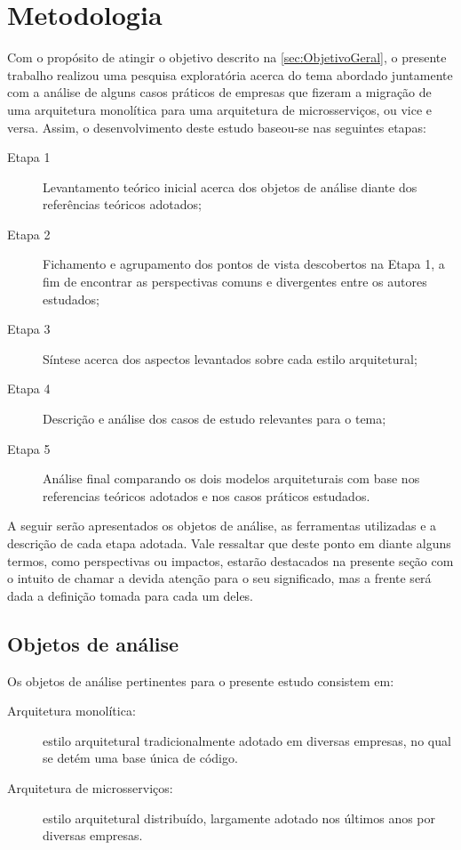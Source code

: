 \chapter{Metodologia}
\label{sec:Metodologia}

Com o propósito de atingir o objetivo descrito na \autoref{sec:ObjetivoGeral}, o presente trabalho
realizou uma pesquisa exploratória acerca do tema abordado juntamente com a análise de alguns casos
práticos de empresas que fizeram a migração de uma arquitetura monolítica para uma arquitetura de
microsserviços, ou vice e versa. Assim, o desenvolvimento deste estudo baseou-se nas seguintes etapas:

\begin{description}
    \item [Etapa 1] Levantamento teórico inicial acerca dos objetos de análise diante dos
        referências teóricos adotados;
    \item [Etapa 2] Fichamento e agrupamento dos pontos de vista descobertos na Etapa 1, a fim de
        encontrar as perspectivas comuns e divergentes entre os autores estudados;
    \item [Etapa 3] Síntese acerca dos aspectos levantados sobre cada estilo arquitetural;
    \item [Etapa 4] Descrição e análise dos casos de estudo relevantes para o tema;
    \item [Etapa 5] Análise final comparando os dois modelos arquiteturais com base nos referencias
        teóricos adotados e nos casos práticos estudados.
\end{description}

A seguir serão apresentados os objetos de análise, as ferramentas utilizadas e a descrição de cada
etapa adotada. Vale ressaltar que deste ponto em diante alguns termos, como perspectivas ou
impactos, estarão destacados na presente seção com o intuito de chamar a devida atenção para o seu
significado, mas a frente será dada a definição tomada para cada um deles.

\section{Objetos de análise}
\label{sec:ObjetosDeAnalise}

Os objetos de análise pertinentes para o presente estudo consistem em:

    \begin{description}
        \item [Arquitetura monolítica:] estilo arquitetural tradicionalmente adotado em diversas
            empresas, no qual se detém uma base única de código.
        \item [Arquitetura de microsserviços:] estilo arquitetural distribuído, largamente adotado
            nos últimos anos por diversas empresas.
    \end{description}

